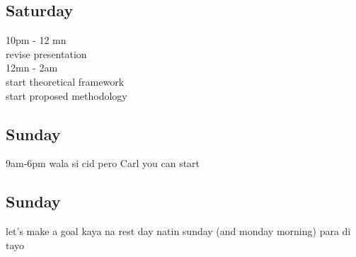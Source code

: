\documentclass{article}
\begin{document}



\subsection{Saturday}
10pm - 12 mn \\
revise presentation \\
12mn - 2am \\
start theoretical framework \\
start proposed methodology \\

\subsection{Sunday}

9am-6pm wala si cid pero Carl you can start



\subsection{Sunday}
let's make a goal kaya na rest day natin sunday (and monday morning) para di tayo
\end{document}
